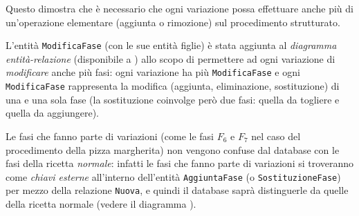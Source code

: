 Questo dimostra che è necessario che ogni variazione possa effettuare anche più di un'operazione
elementare (aggiunta o rimozione) sul procedimento strutturato.

L'entità {\tt ModificaFase} (con le sue entità figlie) è stata aggiunta al {\it diagramma
entità-relazione} (disponibile a ) allo scopo di permettere
ad ogni variazione di {\it modificare} anche più fasi: ogni variazione ha più
{\tt ModificaFase} e ogni {\tt ModificaFase} rappresenta la modifica (aggiunta, eliminazione, sostituzione)
di una e una sola fase (la sostituzione coinvolge però due fasi: quella da togliere e quella da aggiungere).

Le fasi che fanno parte di variazioni (come le fasi $F_{6}$ e $F_{7}$ nel caso del procedimento
della pizza margherita) non vengono confuse dal database con le fasi della ricetta {\it normale}:
infatti le fasi che fanno parte di variazioni si troveranno come {\it chiavi esterne}
all'interno dell'entità {\tt AggiuntaFase} (o {\tt SostituzioneFase}) per mezzo della relazione
{\tt Nuova}, e quindi il database saprà distinguerle da quelle della ricetta normale
(vedere il diagramma ).
